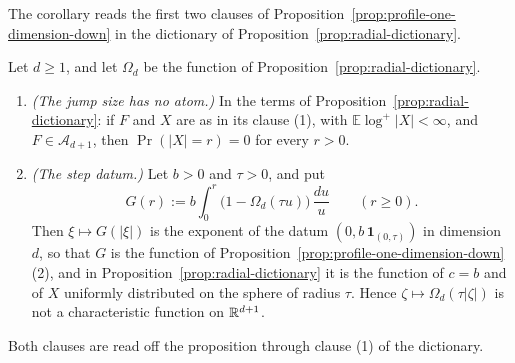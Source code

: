 The corollary reads the first two clauses of
Proposition~\ref{prop:profile-one-dimension-down} in the dictionary of
Proposition~\ref{prop:radial-dictionary}.

\begin{corollary}\label{cor:dictionary-filtration}
Let $d \ge 1$, and let $\Omega_d$ be the function of Proposition~\ref{prop:radial-dictionary}.
\begin{enumerate}
\item \emph{(The jump size has no atom.)} In the terms of
Proposition~\ref{prop:radial-dictionary}: if $F$ and $X$ are as in its clause (1), with
$\mathbb{E}\log^+|X| < \infty$, and $F \in \mathcal{A}_{d+1}$, then $\Pr(|X| = r) = 0$ for every
$r > 0$.
\item \emph{(The step datum.)} Let $b > 0$ and $\tau > 0$, and put
\[
  G(r) := b\int_0^r \bigl(1 - \Omega_d(\tau u)\bigr)\,\frac{du}{u} \qquad (r \ge 0) .
\]
Then $\xi \mapsto G(|\xi|)$ is the exponent of the datum $(0, b\,\mathbf 1_{(0,\tau)})$ in
dimension $d$, so that $G$ is the function of Proposition~\ref{prop:profile-one-dimension-down}(2), and in
Proposition~\ref{prop:radial-dictionary} it is the function of $c = b$ and of $X$ uniformly distributed on
the sphere of radius $\tau$. Hence $\zeta \mapsto \Omega_d(\tau|\zeta|)$ is not a characteristic
function on $\mathbb{R}^{d+1}$.
\end{enumerate}
\end{corollary}

Both clauses are read off the proposition through clause (1) of the dictionary.

